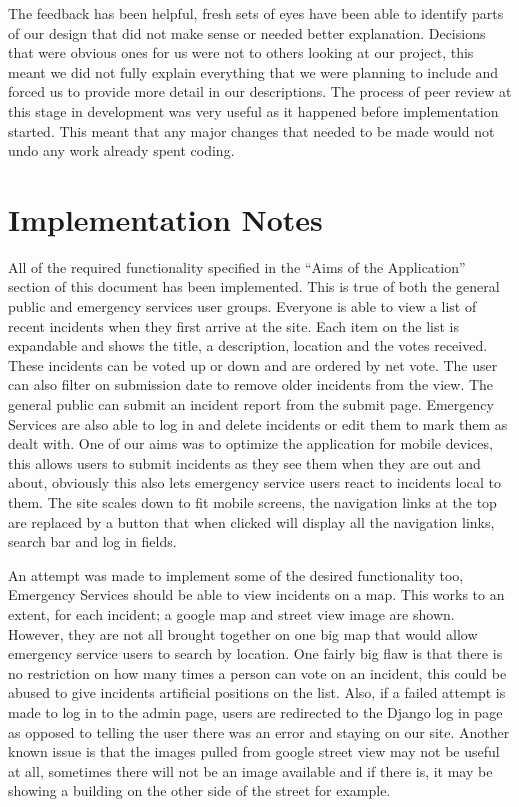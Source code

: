 \documentclass{sig-alt-release2}
\begin{document}
The feedback has been helpful, fresh sets of eyes have been able to identify parts of our design that did not make sense or needed better explanation. Decisions that were obvious ones for us were not to others looking at our project, this meant we did not fully explain everything that we were planning to include and forced us to provide more detail in our descriptions. The process of peer review at this stage in development was very useful as it happened before implementation started. This meant that any major changes that needed to be made would not undo any work already spent coding.

\newpage
\section{Implementation Notes}
All of the required functionality specified in the ``Aims of the Application'' section of this document has been implemented. This is true of both the general public and emergency services user groups. Everyone is able to view a list of recent incidents when they first arrive at the site. Each item on the list is expandable and shows the title, a description, location and the votes received. These incidents can be voted up or down and are ordered by net vote. The user can also filter on submission date to remove older incidents from the view. The general public can submit an incident report from the submit page. Emergency Services are also able to log in and delete incidents or edit them to mark them as dealt with. One of our aims was to optimize the application for mobile devices, this allows users to submit incidents as they see them when they are out and about, obviously this also lets emergency service users react to incidents local to them. The site scales down to fit mobile screens, the navigation links at the top are replaced by a button that when clicked will display all the navigation links, search bar and log in fields.

An attempt was made to implement some of the desired functionality too,  Emergency Services should be able to view incidents on a map. This works to an extent, for each incident; a google map and street view image are shown. However, they are not all brought together on one big map that would allow emergency service users to search by location. One fairly big flaw is that there is no restriction on how many times a person can vote on an incident, this could be abused to give incidents artificial positions on the list. Also, if a failed attempt is made to log in to the admin page, users are redirected to the Django log in page as opposed to telling the user there was an error and staying on our site. Another known issue is that the images pulled from google street view may not be useful at all, sometimes there will not be an image available and if there is, it may be showing a building on the other side of the street for example.
\end{document}
